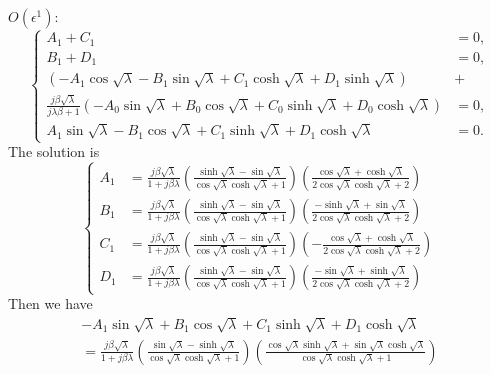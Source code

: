 \documentclass{article}
\begin{document}
\noindent
$O(\epsilon^1)$:
\begin{equation}
    \left\{\begin{aligned}
        A_1 + C_1 &= 0, \\
        B_1 + D_1 &= 0, \\
        \left( - A_1 \cos{\sqrt{\lambda}} - B_1 \sin{\sqrt{\lambda}} + C_1 \cosh{\sqrt{\lambda}} + D_1 \sinh{\sqrt{\lambda}} \right) &+ \\
        \frac{j \beta \sqrt{\lambda}}{ j\lambda \beta + 1 } \left( - A_0 \sin{\sqrt{\lambda}} + B_0 \cos{\sqrt{\lambda}} + C_0 \sinh{\sqrt{\lambda}} + D_0 \cosh{\sqrt{\lambda}} \right) &= 0, \\
        A_1 \sin{\sqrt{\lambda}} - B_1 \cos{\sqrt{\lambda}} + C_1 \sinh{\sqrt{\lambda}} + D_1 \cosh{\sqrt{\lambda}} &= 0.
    \end{aligned}\right.
\end{equation}
The solution is
\begin{equation}
    \left\{\begin{aligned}
        A_1 &= \frac{j \beta  \sqrt{\lambda }}{1+j \beta  \lambda } \left( \frac{\sinh\sqrt{\lambda }-\sin\sqrt{\lambda }}{\cos\sqrt{\lambda } \cosh\sqrt{\lambda }+1} \right) \left(\frac{\cos\sqrt{\lambda }+\cosh\sqrt{\lambda }}{2 \cos\sqrt{\lambda }\cosh\sqrt{\lambda }+2} \right) \\
        B_1 &= \frac{j \beta  \sqrt{\lambda }}{1+j \beta  \lambda } \left( \frac{\sinh\sqrt{\lambda }-\sin\sqrt{\lambda }}{\cos\sqrt{\lambda } \cosh\sqrt{\lambda }+1} \right) \left( \frac{-\sinh\sqrt{\lambda }+\sin\sqrt{\lambda }}{2 \cos\sqrt{\lambda }\cosh\sqrt{\lambda }+2} \right)\\
        C_1 &= \frac{j \beta  \sqrt{\lambda }}{1+j \beta  \lambda } \left( \frac{\sinh\sqrt{\lambda }-\sin\sqrt{\lambda }}{\cos\sqrt{\lambda } \cosh\sqrt{\lambda }+1} \right) \left( -\frac{\cos\sqrt{\lambda }+\cosh\sqrt{\lambda }}{2 \cos\sqrt{\lambda } \cosh\sqrt{\lambda }+2} \right)\\
        D_1 &= \frac{j \beta  \sqrt{\lambda }}{1+j \beta  \lambda } \left( \frac{\sinh\sqrt{\lambda }-\sin\sqrt{\lambda }}{\cos\sqrt{\lambda } \cosh\sqrt{\lambda }+1} \right) \left( \frac{-\sin\sqrt{\lambda }+\sinh\sqrt{\lambda }}{2 \cos\sqrt{\lambda }\cosh\sqrt{\lambda }+2} \right)
    \end{aligned}\right.
\end{equation}
Then we have
\begin{equation}
    \begin{aligned}
        - A_1 \sin{\sqrt{\lambda}} + B_1 \cos{\sqrt{\lambda}} + C_1 \sinh{\sqrt{\lambda}} + D_1 \cosh{\sqrt{\lambda}} \\
        = \frac{j \beta  \sqrt{\lambda }}{1+j \beta  \lambda } \left(\frac{\sin\sqrt{\lambda } -\sinh\sqrt{\lambda }}{\cos\sqrt{\lambda } \cosh\sqrt{\lambda }+1} \right)  \left( \frac{\cos\sqrt{\lambda } \sinh\sqrt{\lambda }+\sin\sqrt{\lambda } \cosh\sqrt{\lambda }}{\cos\sqrt{\lambda } \cosh\sqrt{\lambda }+1} \right)
    \end{aligned}
\end{equation}
\end{document}
